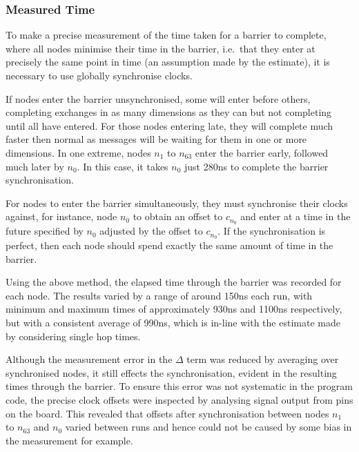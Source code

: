 \subsubsection{Measured Time}

To make a precise measurement of the time taken for a barrier to complete, where
all nodes minimise their time in the barrier, i.e.\ that they enter at precisely
the same point in time (an assumption made by the estimate), it is
necessary to use globally synchronise clocks.

If nodes enter the barrier unsynchronised, some will enter before others,
completing exchanges in as many dimensions as they can but not completing until
all have entered. For those nodes entering late, they will complete much faster
then normal as messages will be waiting for them in one or more dimensions. In
one extreme, nodes $n_1$ to $n_{63}$ enter the barrier early, followed much
later by $n_0$. In this case, it takes $n_0$ just 280ns to complete the barrier
synchronisation.

For nodes to enter the barrier simultaneously, they must synchronise their
clocks against, for instance, node $n_0$ to obtain an offset to $c_{n_0}$ and
enter at a time in the future specified by $n_0$ adjusted by the offset to
$c_{n_0}$. If the synchronisation is perfect, then each node should spend
exactly the same amount of time in the barrier.

Using the above method, the elapsed time through the barrier was recorded for
each node. The results varied by a range of around 150ns each run, with minimum
and maximum times of approximately 930ns and 1100ns respectively, but with a
consistent average of 990ns, which is in-line with the estimate made by
considering single hop times.

Although the measurement error in the $\Delta$ term was reduced by averaging
over synchronised nodes, it still effects the synchronisation, evident in the
resulting times through the barrier. To ensure this error was not systematic in
the program code, the precise clock offsets were inspected by analysing signal
output from pins on the board. This revealed that offsets after synchronisation
between nodes $n_1$ to $n_{63}$ and $n_0$ varied between runs and hence could
not be caused by some bias in the measurement for example.

